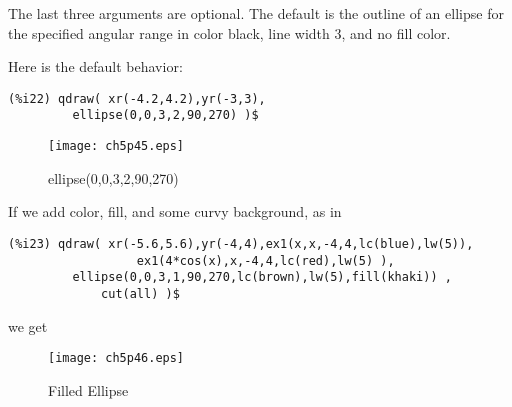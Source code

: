 \documentclass[12pt]{article}
\begin{document}
\smallskip
The last three arguments are optional.
The default is the outline of an ellipse for the specified angular range in
  color black, line width 3, and no fill color.
  
\smallskip
Here is the default behavior:
\small
\begin{verbatim}
(%i22) qdraw( xr(-4.2,4.2),yr(-3,3),
         ellipse(0,0,3,2,90,270) )$
\end{verbatim}
\normalsize
\begin{figure} [h]
   \centerline{\texttt{[image: ch5p45.eps]} }
	\caption{ellipse(0,0,3,2,90,270)}
\end{figure}      

\newpage
If we add color, fill, and some curvy background, as in
\small
\begin{verbatim}
(%i23) qdraw( xr(-5.6,5.6),yr(-4,4),ex1(x,x,-4,4,lc(blue),lw(5)),
                  ex1(4*cos(x),x,-4,4,lc(red),lw(5) ),
         ellipse(0,0,3,1,90,270,lc(brown),lw(5),fill(khaki)) ,
             cut(all) )$
\end{verbatim}
\normalsize
%

we get
\begin{figure} [h]
   \centerline{\texttt{[image: ch5p46.eps]} }
	\caption{Filled Ellipse}
\end{figure}      

\smallskip
\end{document}
